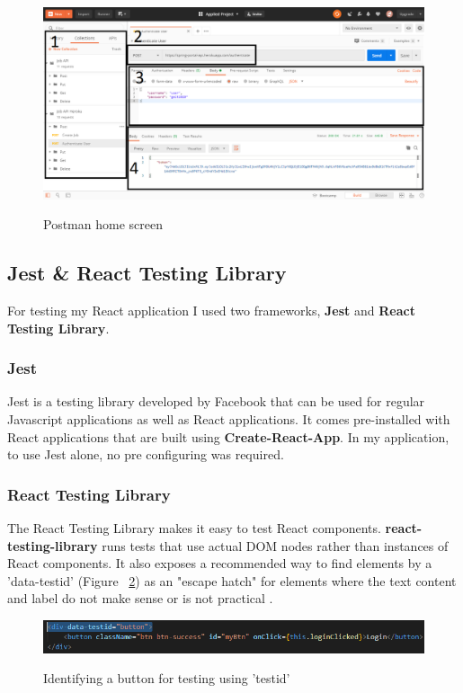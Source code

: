 \begin{figure}[ht]
    \centering
    \includegraphics[scale=0.3]{Images/postman.png} 
    \label{postman_label}
    \caption{Postman home screen}
\end{figure}

\subsection{Jest \& React Testing Library}
For testing my React application I used two frameworks, \textbf{Jest} and \textbf{React Testing Library}.

\subsubsection{Jest}
Jest is a testing library developed by Facebook that can be used for regular Javascript applications as well as React applications. It comes pre-installed with React applications that are built using \textbf{Create-React-App}. In my application, to use Jest alone, no pre configuring was required.

\subsubsection{React Testing Library}
The React Testing Library makes it easy to test React components. \textbf{react-testing-library} runs tests that use actual DOM nodes rather than instances of React components. It also exposes a recommended way to find elements by a 'data-testid' (Figure ~\ref{testid_label}) as an "escape hatch" for elements where the text content and label do not make sense or is not practical \cite{TestingLibrary}.

\begin{figure}[h]
    \centering
    \includegraphics[scale=0.6]{Images/test1.png} 
    \label{testid_label}
    \caption{Identifying a button for testing using 'testid'}
\end{figure}


